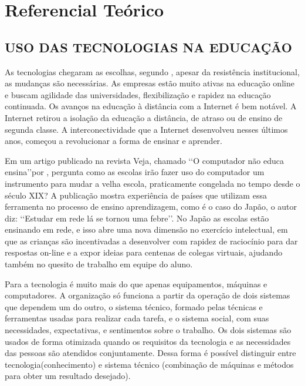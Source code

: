 \chapter[REFERENCIAL TEÓRICO]{Referencial Teórico}

\section{USO DAS TECNOLOGIAS NA EDUCAÇÃO}

As tecnologias chegaram as escolhas, segundo , apesar da resistência institucional, as mudanças são necessárias. As empresas estão muito ativas na educação online e buscam agilidade das universidades, flexibilização e rapidez na educação continuada. Os avanços na educação à distância com a Internet é bem notável. A Internet retirou a isolação da educação a distância, de atraso ou de ensino de segunda classe. A interconectividade que a Internet desenvolveu nesses últimos anos, começou a revolucionar a forma de ensinar e aprender.

Em um artigo publicado na revista Veja, chamado \lq\lq O computador não educa ensina\rq\rq por , pergunta como as escolas irão fazer uso do computador um instrumento para mudar a velha escola, praticamente congelada no tempo desde o século XIX? A publicação mostra experiência de países que utilizam essa ferramenta no processo de ensino aprendizagem, como é o caso do Japão, o autor diz: \lq\lq Estudar em rede lá se tornou uma febre\rq\rq. No Japão as escolas estão ensinando em rede, e isso abre uma nova dimensão no exercício intelectual, em que as crianças são incentivadas a desenvolver com rapidez de raciocínio para dar respostas on-line e a expor ideias para centenas de colegas virtuais, ajudando também no quesito de trabalho em equipe do aluno.

Para   a tecnologia é muito mais do que apenas equipamentos, máquinas e computadores. A organização só funciona a partir da operação de dois sistemas que dependem um do outro, o sistema técnico, formado pelas técnicas e ferramentas usadas para realizar cada tarefa, e o sistema social, com suas necessidades, expectativas, e sentimentos sobre o trabalho. Os dois sistemas são usados de forma otimizada quando os requisitos da tecnologia e as necessidades das pessoas são atendidos conjuntamente. Dessa forma é possível distinguir entre tecnologia(conhecimento) e sistema técnico (combinação de máquinas e métodos para obter um resultado desejado).

